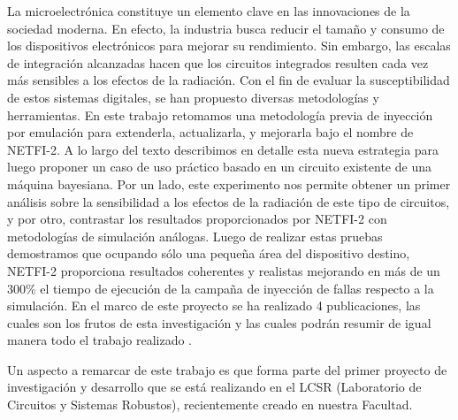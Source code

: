 \documentclass[a4paper,openright,12pt]{report}
\begin{document}
La microelectrónica constituye un elemento clave en las innovaciones de la sociedad moderna. En efecto, la industria busca reducir el tamaño y consumo de los dispositivos electrónicos para mejorar su rendimiento. Sin embargo, las escalas de integración alcanzadas hacen que los circuitos integrados resulten cada vez más sensibles a los efectos de la radiación. Con el fin de evaluar la susceptibilidad de estos sistemas digitales, se han propuesto diversas metodologías y herramientas. En este trabajo retomamos una metodología previa de inyección por emulación para extenderla, actualizarla, y mejorarla bajo el nombre de NETFI-2. A lo largo del texto describimos en detalle esta nueva estrategia para luego proponer un caso de uso práctico basado en un circuito existente de una máquina bayesiana. Por un lado, este experimento nos permite obtener un primer análisis sobre la sensibilidad a los efectos de la radiación de este tipo de circuitos, y por otro, contrastar los resultados proporcionados por NETFI-2 con metodologías de simulación análogas. Luego de realizar estas pruebas demostramos que ocupando sólo una pequeña área del dispositivo destino, NETFI-2 proporciona resultados coherentes y realistas mejorando en más de un 300\% el tiempo de ejecución de la campaña de inyección de fallas respecto a la simulación. En el marco de este proyecto se ha realizado 4 publicaciones, las cuales son los frutos de esta investigación y las cuales podrán resumir de igual manera todo el trabajo realizado \cite{SanLuis} \cite{Alemania} \cite{Alemania2} \cite{Bariloche}.

Un aspecto a remarcar de este trabajo es que forma parte del primer proyecto de investigación y desarrollo que se está realizando en el LCSR (Laboratorio de Circuitos y Sistemas Robustos), recientemente creado en nuestra Facultad.

		
		




\cleardoublepage
{} %
%
\listoffigures %
\end{document}

